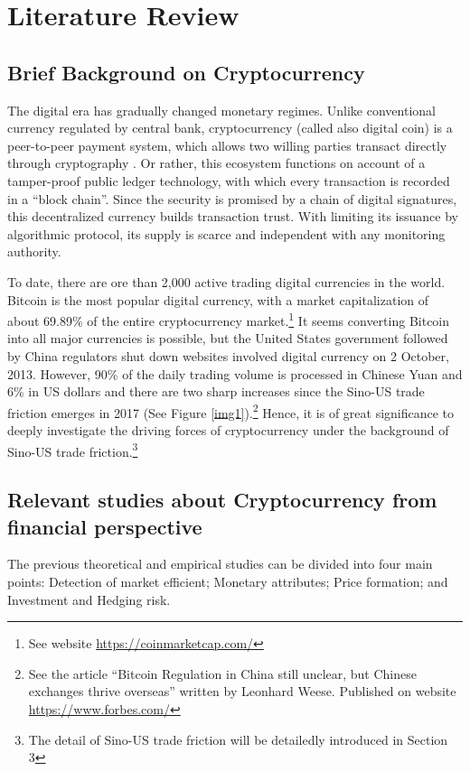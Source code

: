 \documentclass[review]{elsarticle}
\begin{document}
\section{Literature Review}
\subsection{Brief Background on Cryptocurrency}
The digital era has gradually changed monetary regimes. Unlike conventional currency regulated by central bank, cryptocurrency (called also digital coin) is a peer-to-peer payment system, which allows two willing parties transact directly through cryptography \cite{nakamoto2008bitcoin}. Or rather, this ecosystem functions on account of a tamper-proof public ledger technology, with which every transaction is recorded in a ``block chain''. Since the security is promised by a chain of digital signatures, this decentralized currency builds transaction trust.  With limiting its issuance by algorithmic protocol, its supply is scarce and independent with any monitoring authority. 


To date, there are ore than 2,000 active trading digital currencies in the world. Bitcoin is the most popular digital currency, with a market capitalization of about 69.89\% of the entire cryptocurrency market.\footnote{See website \url{https://coinmarketcap.com/} } It seems converting Bitcoin into all major currencies is possible, but the United States government followed by China regulators shut down websites involved digital currency on 2 October, 2013. However, 90\% of the daily trading volume is processed in Chinese Yuan and 6\% in US dollars and there are two sharp increases since the Sino-US trade friction emerges in 2017 (See Figure \ref{img1}).\footnote{See the article ``Bitcoin Regulation in China still unclear, but Chinese exchanges thrive overseas'' written by Leonhard Weese. Published on website \url{https://www.forbes.com/}}  Hence, it is of great significance to deeply investigate the driving forces of cryptocurrency under the background of Sino-US trade friction.\footnote{The detail of Sino-US trade friction will be detailedly introduced in Section 3}


\subsection{Relevant studies about Cryptocurrency from financial perspective}
The previous theoretical and empirical studies can be divided into four main points: Detection of market efficient; Monetary attributes; Price formation; and Investment and Hedging risk.
\end{document}

